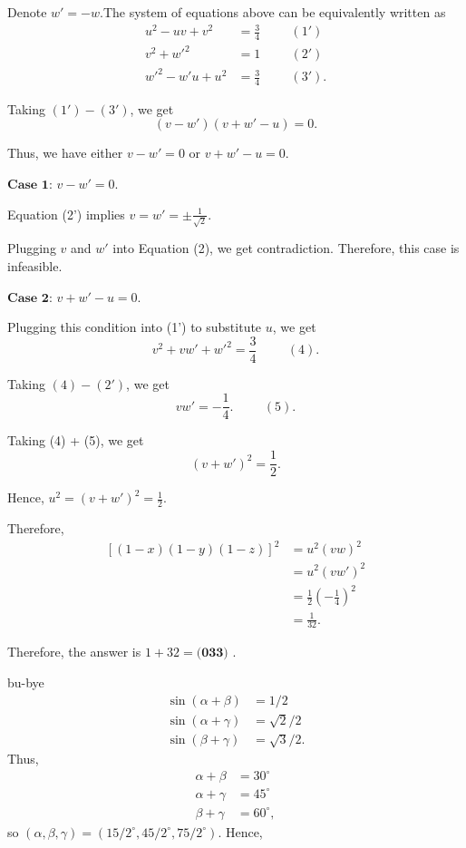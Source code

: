 \begin{enumerate}
 Denote $w' = - w$.The system of equations above can be equivalently written as
 \begin{align*} u^2 - uv + v^2 & = \frac{3}{4} \hspace{1cm} (1') \\ v^2 + w'^2 & = 1 \hspace{1cm} (2') \\ w'^2 - w'u + u^2 & = \frac{3}{4} \hspace{1cm} (3') . \end{align*}


 Taking $(1') - (3')$, we get
 \[ (v - w') (v + w' - u) = 0 . \]

 Thus, we have either $v - w' = 0$ or $v + w' - u = 0$.

 $\textbf{Case 1}$: $v - w' = 0$.

 Equation (2') implies $v = w' = \pm \frac{1}{\sqrt{2}}$.

 Plugging $v$ and $w'$ into Equation (2), we get contradiction. Therefore, this case is infeasible.

 $\textbf{Case 2}$: $v + w' - u = 0$.

 Plugging this condition into (1') to substitute $u$, we get
 \[ v^2 + v w' + w'^2 = \frac{3}{4} \hspace{1cm} (4) . \]

 Taking $(4) - (2')$, we get
 \[ v w' = - \frac{1}{4} . \hspace{1cm} (5) . \]

 Taking (4) + (5), we get
 \[ \left( v + w' \right)^2 = \frac{1}{2} . \]

 Hence, $u^2 = \left( v + w' \right)^2 = \frac{1}{2}$.

 Therefore,
 \begin{align*} \left[ (1-x)(1-y)(1-z) \right]^2 & = u^2 (vw)^2 \\ & = u^2 (vw')^2 \\ & = \frac{1}{2} \left( - \frac{1}{4} \right)^2 \\ & = \frac{1}{32} . \end{align*}


 Therefore, the answer is $1 + 32 = \boxed{\textbf{(033) }}$.

 bu-bye
 \begin{align*} \sin(\alpha + \beta) &= 1/2 \\  \sin(\alpha + \gamma) &= \sqrt2/2 \\  \sin(\beta + \gamma) &= \sqrt3/2. \end{align*}
Thus, 
 \begin{align*} \alpha + \beta &= 30^{\circ} \\  \alpha + \gamma &= 45^{\circ} \\  \beta + \gamma &= 60^{\circ}, \end{align*}
so $(\alpha, \beta, \gamma) = (15/2^{\circ}, 45/2^{\circ}, 75/2^{\circ})$. Hence,


\end{enumerate}
